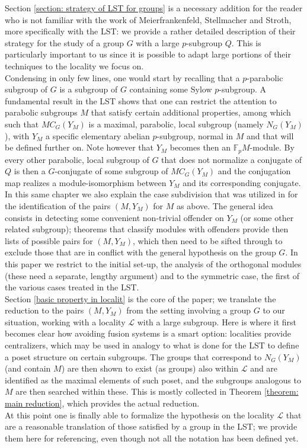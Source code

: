 \documentclass{amsart}
\numberwithin{equation}{section}
\theoremstyle{definition}
\theoremstyle{subresult}
\theoremstyle{caseresult}
\newcommand{\bF}{\mathbb{F}}
\renewcommand{\L}{\mathcal{L}}
\newcommand{\<}{\langle}
\renewcommand{\>}{\rangle}
\begin{document}
Section \ref{section: strategy of LST for groups} is a necessary addition for the reader who is not familiar with the work of Meierfrankenfeld, Stellmacher and Stroth, more specifically with the LST: we provide a rather detailed description of their strategy for the study of a group $G$ with a large $p$-subgroup $Q$. This is particularly important to us since it is possible to adapt large portions of their techniques to the locality we focus on.\\
Condensing in only few lines, one would start by recalling that a $p$-parabolic subgroup of $G$ is a subgroup of $G$ containing some Sylow $p$-subgroup. A fundamental result in the LST shows that one can restrict the attention to parabolic subgroups $M$ that satisfy certain additional properties, among which such that $MC_G(Y_M)$ is a maximal, parabolic, local subgroup (namely $N_G(Y_M)$), with $Y_M$ a specific elementary abelian $p$-subgroup, normal in $M$ and that will be defined further on. Note however that $Y_M$ becomes then an $\bF_p M$-module. By \cite[]{Meier-Stell-Stroth:2012} every other parabolic, local subgroup of $G$ that does not normalize a conjugate of $Q$ is then a $G$-conjugate of some subgroup of $MC_G(Y_M)$ and the conjugation map realizes a module-isomorphism between $Y_M$ and its corresponding conjugate.\\
In this same chapter we also explain the case subdivision that was utilized in \cite{Meier-Stell-Stroth:2012} for the identification of the pairs $(M,Y_M)$ for $M$ as above. The general idea consists in detecting some convenient non-trivial offender on $Y_M$ (or some other related subgroup); theorems that classify modules with offenders provide then lists of possible pairs for $(M,Y_M)$, which then need to be sifted through to exclude those that are in conflict with the general hypothesis on the group $G$. In this paper we restrict to the initial set-up, the analysis of the orthogonal modules (these need a separate, lengthy argument) and to the symmetric case, the first of the various cases treated in the LST.\\

Section \ref{basic property in localit} is the core of the paper; we translate the reduction to the pairs $(M,Y_M)$ from the setting involving a group $G$ to our situation, working with a locality $\L$ with a large subgroup. Here is where it first becomes clear how avoiding fusion systems is a smart option: localities provide centralizers, which may be used in analogy to what is done for the LST to define a poset structure on certain subgroups. The groups that correspond to $N_G(Y_M)$ (and contain $M$) are then shown to exist (as groups) also within $\L$ and are identified as the maximal elements of such poset, and the subgroups analogous to $M$ are then searched within these. This is mostly collected in Theorem \ref{theorem: main reduction}, which provides the actual reduction.\\
At this point one is finally able to formalize the hypothesis on the locality $\L$ that are a reasonable translation of those satisfied by a group in the LST; we provide them here for referencing, even though not all the notation has been defined yet.
\end{document}
